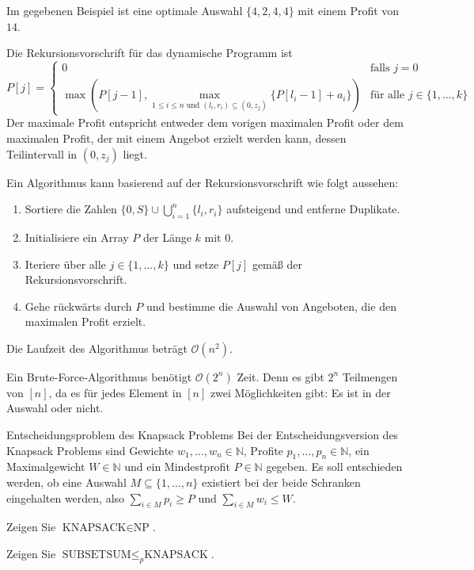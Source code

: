 \documentclass{article}
\begin{document}
\begin{solutions}
  \item Im gegebenen Beispiel ist eine optimale Auswahl $\{4, 2, 4, 4\}$ mit einem Profit von $14$.
  \item Die Rekursionsvorschrift für das dynamische Programm ist \[
    P[j] = \begin{cases}
      0                                                                                          & \text{falls } j = 0                     \\
      \max(P[j-1], \max_{1\leq i\leq n\text{ und } (l_i,r_i) \subseteq (0,z_j)}\{P[l_i-1]+a_i\}) & \text{für alle } j \in \{1, \ldots, k\}
    \end{cases}
  \] Der maximale Profit entspricht entweder dem vorigen maximalen Profit oder dem maximalen Profit, der mit einem Angebot erzielt werden kann, dessen Teilintervall in $(0, z_j)$ liegt.
  \item Ein Algorithmus kann basierend auf der Rekursionsvorschrift wie folgt aussehen:
  \begin{enumerate}
    \item Sortiere die Zahlen $\{0, S\} \cup \bigcup_{i=1}^n \{l_i, r_i\}$ aufsteigend und entferne Duplikate.
    \item Initialisiere ein Array $P$ der Länge $k$ mit $0$.
    \item Iteriere über alle $j \in \{1, \ldots, k\}$ und setze $P[j]$ gemäß der Rekursionsvorschrift.
    \item Gehe rückwärts durch $P$ und bestimme die Auswahl von Angeboten, die den maximalen Profit erzielt.
  \end{enumerate}
  Die Laufzeit des Algorithmus beträgt $\mathcal{O}(n^2)$.
  \item Ein Brute-Force-Algorithmus benötigt $\mathcal{O}(2^n)$ Zeit. Denn es gibt $2^n$ Teilmengen von $[n]$, da es für jedes Element in $[n]$ zwei Möglichkeiten gibt: Es ist in der Auswahl oder nicht.
\end{solutions}

\begin{eexercises}{Entscheidungsproblem des Knapsack Problems}{
    Bei der Entscheidungsversion des Knapsack Problems sind Gewichte $w_1, \ldots, w_n \in \mathbb{N}$, Profite $p_1, \ldots, p_n \in \mathbb{N}$, ein Maximalgewicht $W \in \mathbb{N}$ und ein Mindestprofit $P \in \mathbb{N}$ gegeben. Es soll entschieden werden, ob eine Auswahl $M \subseteq \{1, \ldots, n\}$ existiert bei der beide Schranken eingehalten werden, also $\sum_{i \in M} p_i \geq P$ und $\sum_{i \in M} w_i \leq W$.
  }
  \item Zeigen Sie $\text{KNAPSACK} \in \text{NP}$.
  \item Zeigen Sie $\text{SUBSETSUM} \leq_p \text{KNAPSACK}$.
\end{eexercises}
\end{document}
